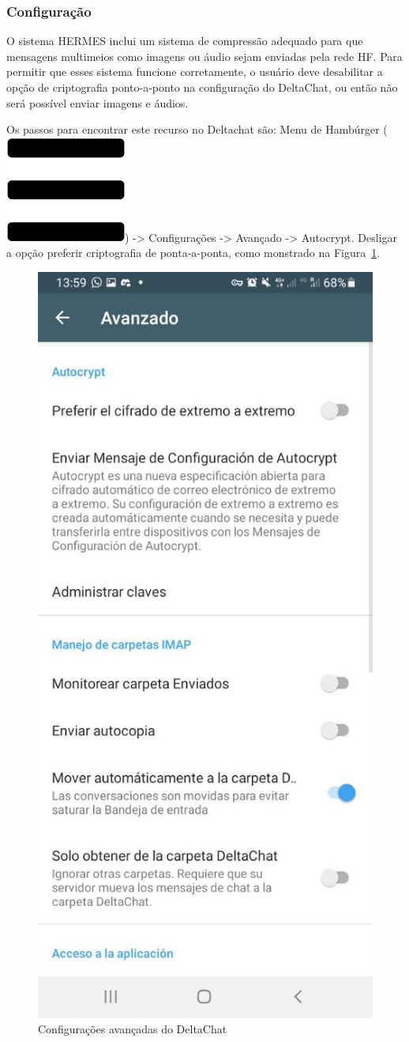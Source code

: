 \documentclass[11pt,a4paper]{article}
\begin{document}

\subsubsection{Configuração}

O sistema HERMES inclui um sistema de compressão adequado para que mensagens multimeios como imagens ou áudio sejam enviadas pela rede HF. Para permitir que esses sistema funcione corretamente, o usuário deve desabilitar a opção de criptografia ponto-a-ponto na configuração do DeltaChat, ou então não será possível enviar imagens e áudios.


Os passos para encontrar este recurso no Deltachat são: Menu de Hambúrger (\includegraphics[height=0.78\baselineskip]{pictures/burger.png}) -> Configurações -> Avançado -> Autocrypt. Desligar a opção preferir criptografia de ponta-a-ponta, como monstrado na Figura~\ref{fig:deltachat-adv_p2pe}.


\begin{figure}[H]
    \centering
    \includegraphics[width=0.3\columnwidth]{screenshots/deltachat/es/adv_p2pe_es.jpeg}
    	\caption{Configurações avançadas do DeltaChat}
	\vspace{-10pt}
    \label{fig:deltachat-adv_p2pe}
\end{figure}
\end{document}
